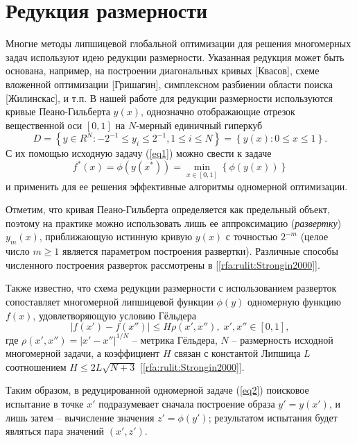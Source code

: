 \documentclass[10pt,a4paper]{book}
\begin{document}
\section{Редукция размерности}

Многие методы липшицевой глобальной оптимизации для решения многомерных задач используют идею редукции размерности. Указанная редукция может быть основана, например, на построении диагональных кривых [\colorbox[rgb]{1,1,0.6}{Квасов}], схеме вложенной оптимизации [\colorbox[rgb]{1,1,0.6}{Гришагин}], симплексном разбиении области поиска [\colorbox[rgb]{1,1,0.6}{Жилинскас}], и т.п.
В нашей работе для редукции размерности используются кривые Пеано-Гильберта $y(x)$, однозначно отображающие отрезок вещественной оси  $[0,1]$ на $N$-мерный единичный гиперкуб
\begin{equation}\label{eq2_} 
D=\left\{ y \in R^N: -2^{-1} \leq y_i \leq 2^{-1}, 1 \leq i \leq N \right\} = \left\{ y(x): 0 \leq x \leq 1 \right\}.
\end{equation}
С их помощью исходную задачу (\ref{eq1}) можно свести к задаче 
\begin{equation}\label{eq2} 
f^*(x)=\phi(y(x^* ))=\min_{x \in [0,1]} \left\{ \phi(y(x)) \right\}
\end{equation}
и применить для ее решения эффективные алгоритмы одномерной оптимизации. 

Отметим, что кривая Пеано-Гильберта определяется как предельный объект, поэтому на практике можно использовать лишь ее аппроксимацию (\textit{развертку}) $y_m(x)$, приближающую истинную кривую $y(x)$ с точностью $2^{-m}$ (целое число $m \geq 1$ является параметром построения развертки). Различные способы численного построения разверток рассмотрены в [\ref{rfa:rulit:Strongin2000}].

Также известно, что схема редукции размерности с использованием разверток сопоставляет многомерной липшицевой функции $\phi(y)$ одномерную функцию $f(x)$, удовлетворяющую условию Гёльдера
\begin{equation}\label{eq4} 
| f(x')-f(x'') | \leq H \rho(x',x''), \; x',x'' \in [0,1],
\end{equation}
где $\rho(x',x'') =  |x' - x''|^{1/N}$ -- метрика Гёльдера, $N$ -- размерность исходной многомерной задачи, а коэффициент $H$ связан с константой Липшица $L$ соотношением $H \leq 2L\sqrt {N+3}$ [\ref{rfa:rulit:Strongin2000}].

Таким образом, в редуцированной одномерной задаче (\ref{eq2}) поисковое испытание в точке $x'$ подразумевает сначала построение образа $y' = y(x')$, и лишь затем -- вычисление значения $z'=\phi(y')$; результатом испытания будет являться пара значений $(x',z')$.
\end{document}
